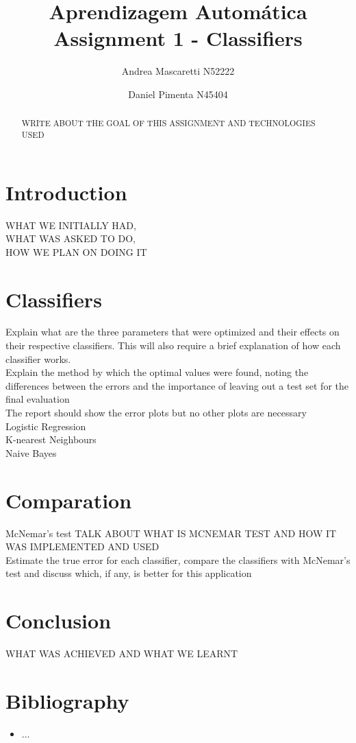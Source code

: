 \documentclass[a4paper]{article}
\title{Aprendizagem Automática \\
\large Assignment 1 - Classifiers}
\author{Andrea Mascaretti N52222\and Daniel Pimenta N45404}
\begin{document}
\maketitle

\begin{abstract}
WRITE ABOUT THE GOAL OF THIS ASSIGNMENT AND TECHNOLOGIES USED\\
\end{abstract}

\section{Introduction}
WHAT WE INITIALLY HAD,\\
WHAT WAS ASKED TO DO,\\
HOW WE PLAN ON DOING IT\\

\section{Classifiers}

Explain what are the three parameters that were optimized and their effects on their respective classifiers. This will also require a brief explanation of how each classifier works.\\
Explain the method by which the optimal values were found, noting the differences between the errors and the importance of leaving out a test set for the final evaluation\\
The report should show the error plots but no other plots are necessary\\

\large Logistic Regression\\

\large K-nearest Neighbours \\

\large Naive Bayes\\

\section{Comparation}

\large McNemar's test
TALK ABOUT WHAT IS MCNEMAR TEST AND HOW IT WAS IMPLEMENTED AND USED\\
Estimate the true error for each classifier, compare the classifiers with McNemar's test and discuss which, if any, is better for this application\\


\section{Conclusion}
WHAT WAS ACHIEVED AND WHAT WE LEARNT\\

\section{Bibliography}
\begin{itemize}
\item ...\\
\end{itemize}
\end{document}
